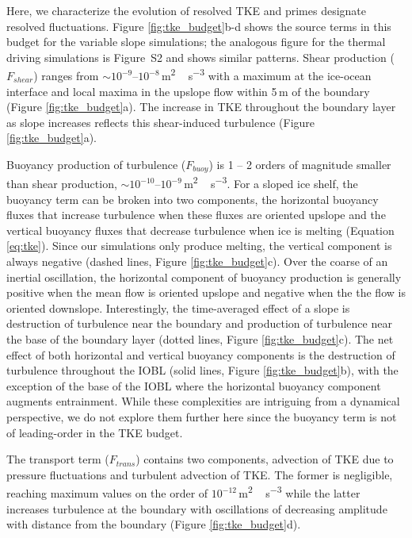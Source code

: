 \documentclass[tc, manuscript]{copernicus}
\begin{document}
Here, we characterize the evolution of resolved TKE and primes designate resolved fluctuations. Figure \ref{fig:tke_budget}b-d shows the source terms in this budget for the variable slope simulations; the analogous figure for the thermal driving simulations is Figure~S2 and shows similar patterns. Shear production ($F_{shear}$) ranges from $\sim 10^{-9} \textrm{--} 10^{-8}$\,\unit{m^2\,s^{-3}} with a maximum at the ice-ocean interface and local maxima in the upslope flow within 5\,\unit{m} of the boundary (Figure \ref{fig:tke_budget}a). The increase in TKE throughout the boundary layer as slope increases reflects this shear-induced turbulence (Figure \ref{fig:tke_budget}a).

Buoyancy production of turbulence ($F_{buoy}$) is 1 -- 2 orders of magnitude smaller than shear production, $\sim\!10^{-10} \textrm{--} 10^{-9}$\,\unit{m^2\,s^{-3}}. For a sloped ice shelf, the buoyancy term can be broken into two components, the horizontal buoyancy fluxes that increase turbulence when these fluxes are oriented upslope and the vertical buoyancy fluxes that decrease turbulence when ice is melting (Equation \ref{eq:tke}). Since our simulations only produce melting, the vertical component is always negative (dashed lines, Figure \ref{fig:tke_budget}c). Over the coarse of an inertial oscillation, the horizontal component of buoyancy production is generally positive when the mean flow is oriented upslope and negative when the the flow is oriented downslope. Interestingly, the time-averaged effect of a slope is destruction of turbulence near the boundary and production of turbulence near the base of the boundary layer (dotted lines, Figure \ref{fig:tke_budget}c). The net effect of both horizontal and vertical buoyancy components is the destruction of turbulence throughout the IOBL (solid lines, Figure \ref{fig:tke_budget}b), with the exception of the base of the IOBL where the horizontal buoyancy component augments entrainment. While these complexities are intriguing from a dynamical perspective, we do not explore them further here since the buoyancy term is not of leading-order in the TKE budget.

The transport term ($F_{trans}$) contains two components, advection of TKE due to pressure fluctuations and turbulent advection of TKE. The former is negligible, reaching maximum values on the order of $10^{-12}$\,\unit{m^2\,s^{-3}} while the latter increases turbulence at the boundary with oscillations of decreasing amplitude with distance from the boundary (Figure \ref{fig:tke_budget}d). 
\end{document}
